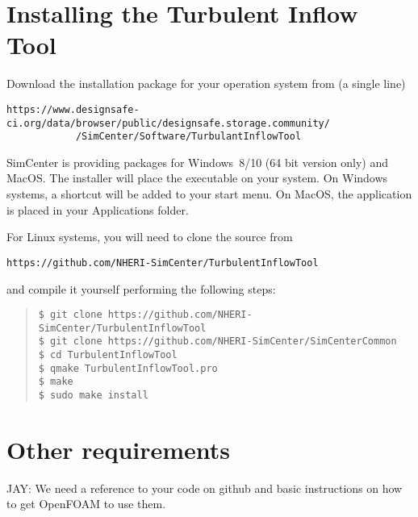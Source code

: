 \label{sec:TInF-installation}

\section{Installing the Turbulent Inflow Tool}

Download the installation package for your operation system from (a single line)
\begin{verbatim}
https://www.designsafe-ci.org/data/browser/public/designsafe.storage.community/
            /SimCenter/Software/TurbulantInflowTool
\end{verbatim}
 SimCenter is providing packages for Windows~8/10 (64 bit version only) and MacOS.  
The installer will place the executable on your system.  On Windows systems, a shortcut will be added to your start menu.
On MacOS, the application is placed in your Applications folder.
\bigskip

For Linux systems, you will need to clone the source from 
\begin{verbatim}
https://github.com/NHERI-SimCenter/TurbulentInflowTool
\end{verbatim}
and compile it yourself performing the following steps:
\begin{quote}
\begin{verbatim}
$ git clone https://github.com/NHERI-SimCenter/TurbulentInflowTool
$ git clone https://github.com/NHERI-SimCenter/SimCenterCommon
$ cd TurbulentInflowTool
$ qmake TurbulentInflowTool.pro
$ make
$ sudo make install
\end{verbatim}
\end{quote}

\section{Other requirements}

JAY: We need a reference to your code on github and basic instructions on how to get OpenFOAM to use them.
